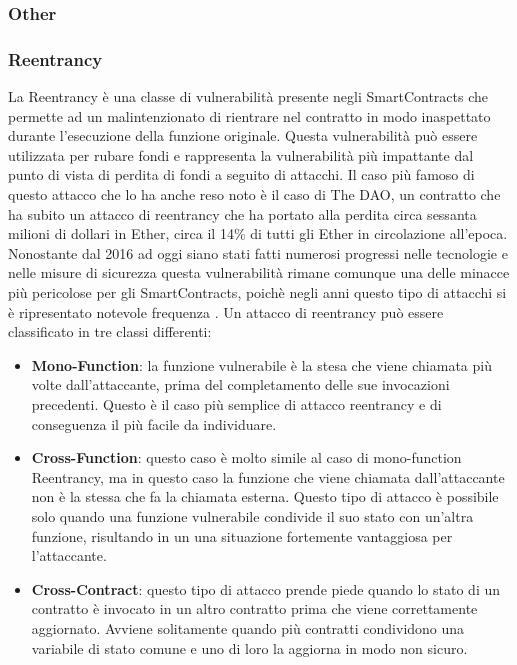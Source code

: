 \documentclass[../../Thesis.tex]{subfiles}
\begin{document}
\subsubsection{Other}
\subsubsection{Reentrancy}
La Reentrancy è una classe di vulnerabilità presente negli SmartContracts che permette ad un malintenzionato di rientrare nel contratto in modo inaspettato durante l'esecuzione della funzione originale. Questa vulnerabilità può essere utilizzata per rubare fondi e rappresenta la vulnerabilità più impattante dal punto di vista di perdita di fondi a seguito di attacchi.
Il caso più famoso di questo attacco che lo ha anche reso noto è il caso di The DAO, un contratto che ha subito un attacco di reentrancy che ha portato alla perdita circa sessanta milioni di dollari in Ether, circa il 14\% di tutti gli Ether in circolazione all'epoca. Nonostante dal 2016 ad oggi siano stati fatti numerosi progressi nelle tecnologie e nelle misure di sicurezza questa vulnerabilità rimane comunque una delle minacce più pericolose per gli SmartContracts, poichè negli anni questo tipo di attacchi si è ripresentato notevole frequenza \cite{reentrancy-historical}. Un attacco di reentrancy può essere classificato in tre classi differenti:
\begin{itemize}
    \item \textbf{Mono-Function}: la funzione vulnerabile è la stesa che viene chiamata più volte dall'attaccante, prima del completamento delle sue invocazioni precedenti. Questo è il caso più semplice di attacco reentrancy e di conseguenza il più facile da individuare.
    \item \textbf{Cross-Function}: questo caso è molto simile al caso di mono-function Reentrancy, ma in questo caso la funzione che viene chiamata dall'attaccante non è la stessa che fa la chiamata esterna. Questo tipo di attacco è possibile solo quando una funzione vulnerabile condivide il suo stato con un'altra funzione, risultando in un una situazione fortemente vantaggiosa per l'attaccante. 
    \item \textbf{Cross-Contract}: questo tipo di attacco prende piede quando lo stato di un contratto è invocato in un altro contratto prima che viene correttamente aggiornato. Avviene solitamente quando più contratti condividono una variabile di stato comune e uno di loro la aggiorna in modo non sicuro. 
\end{itemize}
\end{document}
